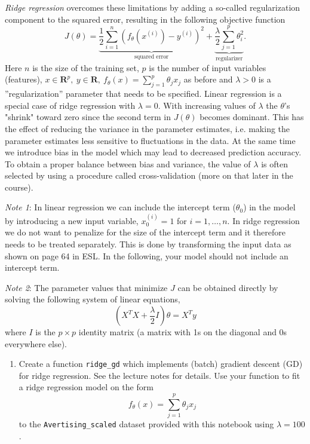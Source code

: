 \documentclass[11pt]{article}
\providecommand{\tightlist}{%
      \setlength{\itemsep}{0pt}\setlength{\parskip}{0pt}}
\begin{document}
\emph{Ridge regression} overcomes these limitations by adding a
so-called regularization component to the squared error, resulting in
the following objective function \[
J(\theta) = \underbrace{\frac{1}{2} \sum_{i=1}^n (f_\theta(x^{(i)}) - y^{(i)})^2}_\text{squared error} + \underbrace{\frac{\lambda}{2} \sum_{j=1}^p \theta_i^2}_\text{regularizer}.
\] Here \(n\) is the size of the training set, \(p\) is the number of
input variables (features),
\(x \in \mathbf{R}^p,~ y \in \mathbf{R},~ f_\theta(x)=\sum_{j=1}^p \theta_j x_j\)
as before and \(\lambda>0\) is a ''regularization'' parameter that needs
to be specified. Linear regression is a special case of ridge regression
with \(\lambda = 0\). With increasing values of \(\lambda\) the
\(\theta\)'s "shrink" toward zero since the second term in \(J(\theta)\)
becomes dominant. This has the effect of reducing the variance in the
parameter estimates, i.e. making the parameter estimates less sensitive
to fluctuations in the data. At the same time we introduce bias in the
model which may lead to decreased prediction accuracy. To obtain a
proper balance between bias and variance, the value of \(\lambda\) is
often selected by using a procedure called cross-validation (more on
that later in the course).

\emph{Note 1}: In linear regression we can include the intercept term
(\(\theta_0\)) in the model by introducing a new input variable,
\(x_0^{(i)}=1\) for \(i=1,\ldots,n\). In ridge regression we do not want
to penalize for the size of the intercept term and it therefore needs to
be treated separately. This is done by transforming the input data as
shown on page 64 in ESL. In the following, your model should not include
an intercept term.

\emph{Note 2}: The parameter values that minimize \(J\) can be obtained
directly by solving the following system of linear equations, \[
(X^T X + \frac{\lambda}{2} I)\theta = X^Ty
\] where \(I\) is the \(p \times p\) identity matrix (a matrix with 1s
on the diagonal and 0s everywhere else).

    \begin{enumerate}
\def\labelenumi{\alph{enumi})}
\tightlist
\item
  Create a function \texttt{ridge\_gd} which implements (batch) gradient
  descent (GD) for ridge regression. See the lecture notes for details.
  Use your function to fit a ridge regression model on the form \[
  f_\theta(x)=\sum_{j=1}^p \theta_j x_j
  \] to the \texttt{Avertising\_scaled} dataset provided with this
  notebook using \(\lambda=100\).
\end{enumerate}
\end{document}
